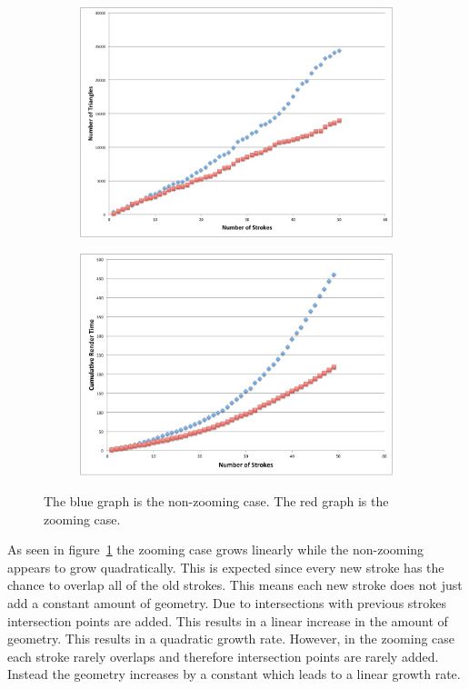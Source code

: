 \documentclass[review]{acmsiggraph}
\begin{document}
\begin{figure}
  \centering
  \begin{subfigure}[b]{0.5\columnwidth}
    \centering
    \includegraphics[width=\columnwidth]{graphs/numtriangles}
    \label{fig:numtriangles}
  \end{subfigure}%
  \begin{subfigure}[b]{0.5\columnwidth}
    \centering
    \includegraphics[width=\columnwidth]{graphs/cumulativetime}
    \label{fig:timing}
  \end{subfigure}%
  \vspace{-0.4cm}
  \caption{The blue graph is the non-zooming case. The red graph is the zooming case.}
\end{figure}

As seen in figure~\ref{fig:numtriangles} the zooming case grows linearly while the non-zooming
appears to grow quadratically. This is expected since every new stroke has the chance to overlap
all of the old strokes. This means each new stroke does not just add a constant amount of geometry.
Due to intersections with previous strokes intersection points are added. This results in a linear
increase in the amount of geometry. This results
in a quadratic growth rate. However, in the zooming case each stroke rarely overlaps and therefore
intersection points are rarely added. Instead the geometry increases by a constant which leads to
a linear growth rate.
\end{document}
